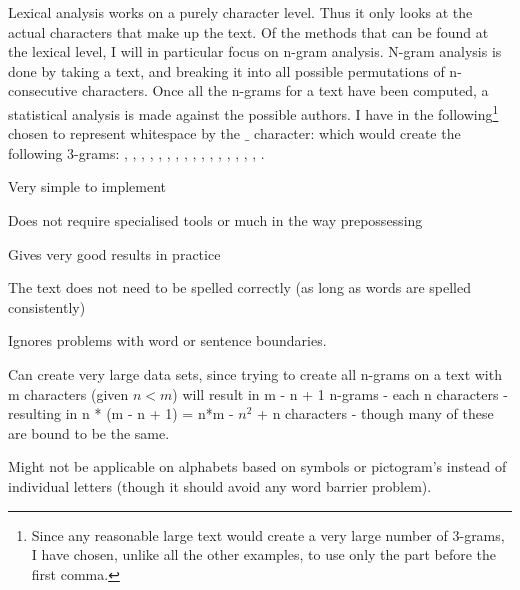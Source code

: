 {\label{character}
Lexical analysis works on a purely character level. Thus it only looks at the actual characters that make up the text. Of the methods that can be found at the lexical level, I will in particular focus on n-gram analysis. N-gram analysis is done by taking a text, and breaking it into all possible permutations of n-consecutive characters. Once all the n-grams for a text have been computed, a statistical analysis is made against the possible authors.
}
{
I have in the following\footnote{Since any reasonable large text would create a very large number of 3-grams, I have chosen, unlike all the other examples, to use only the part before the first comma.} chosen to represent whitespace by the $\_$ character:
which would create the following 3-grams: , , , , , , , , , , , , , , , , . 
}
{
\item Very simple to implement
\item Does not require specialised tools or much in the way prepossessing
\item Gives very good results in practice
\item The text does not need to be spelled correctly (as long as words are spelled consistently)
\item Ignores problems with word or sentence boundaries.
}
{
\item Can create very large data sets, since trying to create all n-grams on a text with m characters (given $n < m$) will result in m - n + 1 n-grams - each n characters - resulting in n * (m - n + 1) = n*m - $n^2$ + n characters - though many of these are bound to be the same.
\item Might not be applicable on alphabets based on symbols or pictogram's instead of individual letters (though it should avoid any word barrier problem).
}

